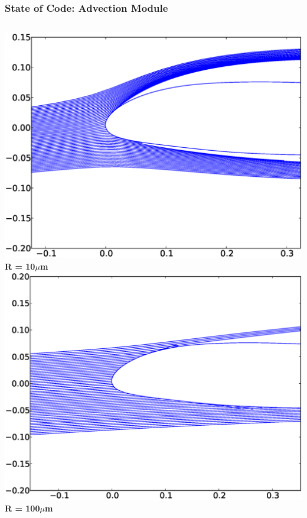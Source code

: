 \documentclass[9pt]{beamer}
\begin{document}
\begin{frame}
\frametitle{State of Code: Advection Module}
\label{sec-2-7}

\begin{columns}[c]
    \centering
    \includegraphics[width=1\textwidth]{ExampleR10em6} \\
    {\bf R = 10$\mu$m}
    \centering
    \includegraphics[width=1\textwidth]{ExampleR100em6} \\
    {\bf R = 100$\mu$m}
\end{columns}
\end{frame}
\end{document}
